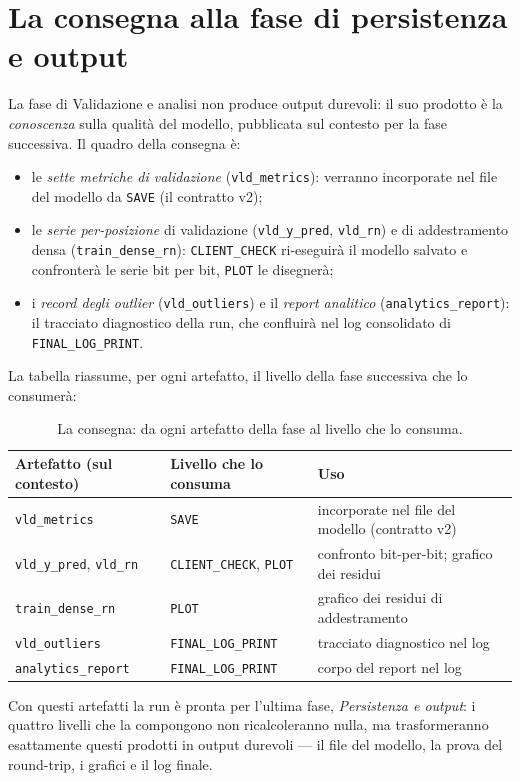 \section{La consegna alla fase di persistenza e output}

La fase di Validazione e analisi non produce output durevoli: il suo
prodotto è la \emph{conoscenza} sulla qualità del modello, pubblicata sul
contesto per la fase successiva. Il quadro della consegna è:

\begin{itemize}
  \item le \emph{sette metriche di validazione} (\texttt{vld\_metrics}):
    verranno incorporate nel file del modello da \texttt{SAVE} (il
    contratto v2);
  \item le \emph{serie per-posizione} di validazione (\texttt{vld\_y\_pred},
    \texttt{vld\_rn}) e di addestramento densa (\texttt{train\_dense\_rn}):
    \texttt{CLIENT\_CHECK} ri-eseguirà il modello salvato e confronterà le
    serie bit per bit, \texttt{PLOT} le disegnerà;
  \item i \emph{record degli outlier} (\texttt{vld\_outliers}) e il
    \emph{report analitico} (\texttt{analytics\_report}): il tracciato
    diagnostico della run, che confluirà nel log consolidato di
    \texttt{FINAL\_LOG\_PRINT}.
\end{itemize}

La tabella riassume, per ogni artefatto, il livello della fase successiva che
lo consumerà:

\begin{table}[htbp]
\centering
\small
\begin{tabular}{lll}
\toprule
Artefatto (sul contesto) & Livello che lo consuma & Uso \\
\midrule
\texttt{vld\_metrics}        & \texttt{SAVE}         & incorporate nel file del modello (contratto v2) \\
\texttt{vld\_y\_pred}, \texttt{vld\_rn} & \texttt{CLIENT\_CHECK}, \texttt{PLOT} & confronto bit-per-bit; grafico dei residui \\
\texttt{train\_dense\_rn}    & \texttt{PLOT}         & grafico dei residui di addestramento \\
\texttt{vld\_outliers}       & \texttt{FINAL\_LOG\_PRINT} & tracciato diagnostico nel log \\
\texttt{analytics\_report}   & \texttt{FINAL\_LOG\_PRINT} & corpo del report nel log \\
\bottomrule
\end{tabular}
\caption{La consegna: da ogni artefatto della fase al livello che lo
consuma.}
\label{tab:handoff}
\end{table}

Con questi artefatti la run è pronta per l'ultima fase, \emph{Persistenza e
output}: i quattro livelli che la compongono non ricalcoleranno nulla, ma
trasformeranno esattamente questi prodotti in output durevoli — il file del
modello, la prova del round-trip, i grafici e il log finale.
